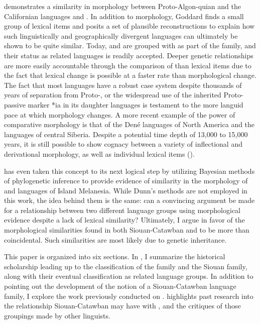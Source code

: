 \documentclass[output=paper]{LSP/langsci}
\begin{document}
\citet{Goddard1975} demonstrates a similarity in morphology between Proto-Algon-quian and the Californian languages  and . In addition to morphology, Goddard finds a small group of lexical items and posits a set of plausible reconstructions to explain how such linguistically and geographically divergent languages can ultimately be shown to be quite similar. Today,  and  are grouped with  as part of the  family, and their status as related languages is readily accepted. Deeper genetic relationships are more easily accountable through the comparison of  than lexical items due to the fact that lexical change is possible at a faster rate than morphological change. The fact that most  languages have a robust case system despite thousands of years of separation from Proto-, or the widespread use of the inherited Proto- passive marker *ia in its daughter languages is testament to the more languid pace at which morphology changes. A more recent example of the power of comparative morphology is that of the Den\'e languages of North America and the  languages of central Siberia. Despite a potential time depth of 13,000 to 15,000 years, it is still possible to show cognacy between a variety of inflectional and derivational morphology, as well as individual lexical items (\citealt{Vajda2010}).

\citet{Dunn2009} has even taken this concept to its next logical step by utilizing Bayesian methods of phylogenetic inference to provide evidence of similarity in the morphology of  and  languages of Island Melanesia. While Dunn's methods are not employed in this work, the idea behind them is the same: can a convincing argument be made for a relationship between two different language groups using morphological evidence despite a lack of lexical similarity? Ultimately, I argue in favor of the morphological similarities found in both Siouan-Catawban and  to be more than coincidental. Such similarities are most likely due to genetic inheritance.

This paper is organized into six sections. In , I summarize the historical scholarship leading up to the classification of the  family and the Siouan family, along with their eventual classification as related language groups. In addition to pointing out the development of the notion of a Siouan-Catawban language family, I explore the work previously conducted on .  highlights past research into the relationship Siouan-Catawban may have with , and the critiques of those groupings made by other linguists. 
\end{document}
